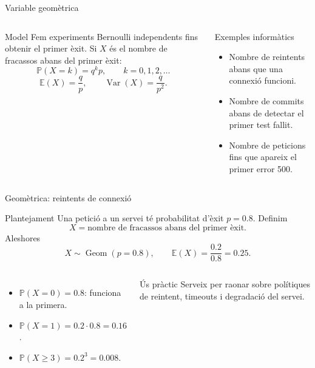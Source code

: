 \documentclass[10pt,aspectratio=169]{beamer}
\newcommand{\Prob}{\mathbb{P}}
\newcommand{\E}{\mathbb{E}}
\newcommand{\Var}{\operatorname{Var}}
\begin{document}
\begin{frame}{Variable geomètrica}
\begin{columns}[T]
\begin{block}{Model}
Fem experiments Bernoulli independents fins obtenir el primer èxit.
Si $X$ és el nombre de fracassos abans del primer èxit:
\[
\Prob(X=k)=q^k p,\qquad k=0,1,2,\ldots
\]
\[
\E(X)=\frac{q}{p},\qquad \Var(X)=\frac{q}{p^2}.
\]
\end{block}
\begin{block}{Exemples informàtics}
\begin{itemize}
  \item Nombre de reintents abans que una connexió funcioni.
  \item Nombre de commits abans de detectar el primer test fallit.
  \item Nombre de peticions fins que apareix el primer error 500.
\end{itemize}
\end{block}
\end{columns}
\end{frame}

\begin{frame}{Geomètrica: reintents de connexió}
\begin{block}{Plantejament}
Una petició a un servei té probabilitat d'èxit $p=0.8$. Definim
\[
X=\text{nombre de fracassos abans del primer èxit}.
\]
Aleshores
\[
X\sim \operatorname{Geom}(p=0.8),\qquad \E(X)=\frac{0.2}{0.8}=0.25.
\]
\end{block}
\begin{columns}[T]
\begin{itemize}
  \item $\Prob(X=0)=0.8$: funciona a la primera.
  \item $\Prob(X=1)=0.2\cdot0.8=0.16$.
  \item $\Prob(X\geq 3)=0.2^3=0.008$.
\end{itemize}
\begin{alertblock}{Ús pràctic}
Serveix per raonar sobre polítiques de reintent, timeouts i degradació del servei.
\end{alertblock}
\end{columns}
\end{frame}
\end{document}
